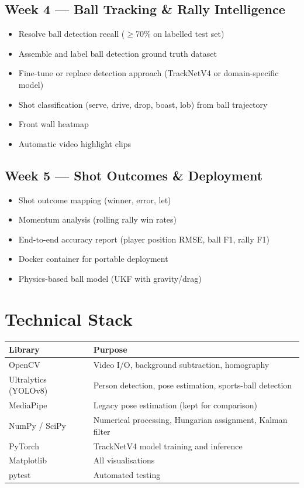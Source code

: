 \documentclass[12pt,a4paper]{article}
\begin{document}
\subsection*{Week 4 — Ball Tracking \& Rally Intelligence}
\begin{itemize}[noitemsep]
    \item Resolve ball detection recall ($\geq$70\% on labelled test set)
    \item Assemble and label ball detection ground truth dataset
    \item Fine-tune or replace detection approach (TrackNetV4 or domain-specific model)
    \item Shot classification (serve, drive, drop, boast, lob) from ball trajectory
    \item Front wall heatmap
    \item Automatic video highlight clips
\end{itemize}

\subsection*{Week 5 — Shot Outcomes \& Deployment}
\begin{itemize}[noitemsep]
    \item Shot outcome mapping (winner, error, let)
    \item Momentum analysis (rolling rally win rates)
    \item End-to-end accuracy report (player position RMSE, ball F1, rally F1)
    \item Docker container for portable deployment
    \item Physics-based ball model (UKF with gravity/drag)
\end{itemize}

\section{Technical Stack}

\begin{center}
\begin{tabular}{ll}
\toprule
\textbf{Library} & \textbf{Purpose} \\
\midrule
OpenCV & Video I/O, background subtraction, homography \\
Ultralytics (YOLOv8) & Person detection, pose estimation, sports-ball detection \\
MediaPipe & Legacy pose estimation (kept for comparison) \\
NumPy / SciPy & Numerical processing, Hungarian assignment, Kalman filter \\
PyTorch & TrackNetV4 model training and inference \\
Matplotlib & All visualisations \\
pytest & Automated testing \\
\bottomrule
\end{tabular}
\end{center}
\end{document}
